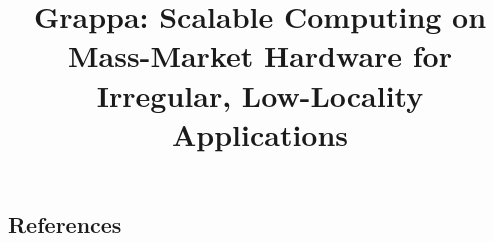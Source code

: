 



\title{Grappa: Scalable Computing on Mass-Market Hardware for Irregular, Low-Locality Applications}

\maketitle
\begin{abstract}

\end{abstract}




















\subsection{References}





